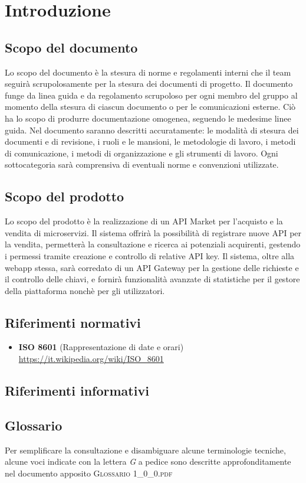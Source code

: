 \newpage
\section{Introduzione}

\subsection{Scopo del documento}
Lo scopo del documento è la stesura di norme e regolamenti interni che il team seguirà scrupolosamente per la stesura dei documenti di progetto. Il documento funge da linea guida e da regolamento scrupoloso per ogni membro del gruppo al momento della stesura di ciascun documento o per le comunicazioni esterne. Ciò ha lo scopo di produrre documentazione omogenea, seguendo le medesime linee guida. Nel documento saranno descritti accuratamente: le modalità di stesura dei documenti e di revisione, i ruoli e le mansioni, le metodologie di lavoro, i metodi di comunicazione, i metodi di organizzazione e gli strumenti di lavoro. Ogni sottocategoria sarà comprensiva di eventuali norme e convenzioni utilizzate.

\subsection{Scopo del prodotto}
Lo scopo del prodotto è la realizzazione di un API Market per l'acquisto e la vendita di microservizi. Il sistema offrirà la possibilità di registrare nuove API per la vendita, permetterà la consultazione e ricerca ai potenziali acquirenti, gestendo i permessi tramite creazione e controllo di relative API key. Il sistema, oltre alla webapp stessa, sarà corredato di un API Gateway per la gestione delle richieste e il controllo delle chiavi, e fornirà funzionalità avanzate di statistiche per il gestore della piattaforma nonchè per gli utilizzatori.

\subsection{Riferimenti normativi}
\begin{itemize}
	\item \textbf{ISO 8601} (Rappresentazione di date e orari) \\
	\url{https://it.wikipedia.org/wiki/ISO_8601}
\end{itemize}
\subsection{Riferimenti informativi}

\subsection{Glossario}
Per semplificare la consultazione e disambiguare alcune terminologie tecniche, alcune voci indicate con la lettera \textit{G} a pedice sono descritte approfonditamente nel documento apposito \textsc{Glossario 1\_0\_0.pdf}